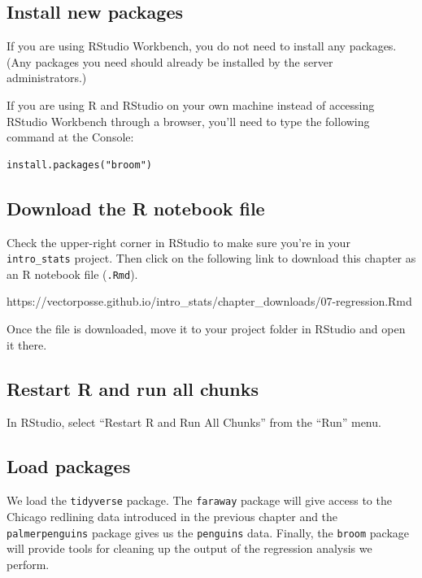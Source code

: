 \documentclass[
]{book}
\begin{document}
\hypertarget{install-new-packages}{%
\subsection{Install new packages}\label{install-new-packages}}

If you are using RStudio Workbench, you do not need to install any packages. (Any packages you need should already be installed by the server administrators.)

If you are using R and RStudio on your own machine instead of accessing RStudio Workbench through a browser, you'll need to type the following command at the Console:

\begin{verbatim}
install.packages("broom")
\end{verbatim}

\hypertarget{regression-download}{%
\subsection{Download the R notebook file}\label{regression-download}}

Check the upper-right corner in RStudio to make sure you're in your \texttt{intro\_stats} project. Then click on the following link to download this chapter as an R notebook file (\texttt{.Rmd}).

https://vectorposse.github.io/intro\_stats/chapter\_downloads/07-regression.Rmd

Once the file is downloaded, move it to your project folder in RStudio and open it there.

\hypertarget{regression-restart}{%
\subsection{Restart R and run all chunks}\label{regression-restart}}

In RStudio, select ``Restart R and Run All Chunks'' from the ``Run'' menu.

\hypertarget{regression-load}{%
\subsection{Load packages}\label{regression-load}}

We load the \texttt{tidyverse} package. The \texttt{faraway} package will give access to the Chicago redlining data introduced in the previous chapter and the \texttt{palmerpenguins} package gives us the \texttt{penguins} data. Finally, the \texttt{broom} package will provide tools for cleaning up the output of the regression analysis we perform.
\end{document}

